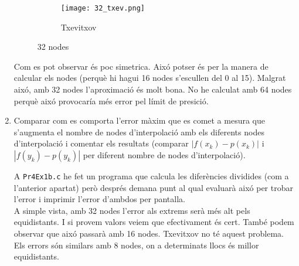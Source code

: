 \documentclass[a4paper, 12pt]{article}
\begin{document}
\begin{exercici}
\begin{enumerate}[label=\alph*)]
\begin{solucio}
\begin{figure}[H]
\begin{subfigure}{0.5\textwidth}
                        \centering
                        \texttt{[image: 32\_txev.png]}
                        \caption{Txevitxov}
                    \end{subfigure}
                    \caption{32 nodes}
                \end{figure}
                Com es pot observar és poc simetrica. Aixó potser és per la manera de calcular els
                nodes (perquè hi hagui 16 nodes s'escullen del 0 al 15). Malgrat aixó, amb 32 nodes
                l'aproximació és molt bona. No he calculat amb 64 nodes perquè aixó provocaría més
                error pel límit de presició.
            \end{solucio}
            \item Comparar com es comporta l'error màxim que es comet a mesura que s'augmenta el
            nombre de nodes d'interpolació amb els diferents nodes d'interpolació i comentar els
            resultats (comparar $\left\lvert f\left(x_k\right)-p\left(x_k\right)\right\rvert$ i $\left\lvert f\left(y_k\right)-p\left(y_k\right)\right\rvert$
            per diferent nombre de nodes d'interpolació). \\
            \begin{solucio}
                A \verb|Pr4Ex1b.c| he fet un programa que calcula les diferències dividides (com a
                l'anterior apartat) però després demana punt al qual evaluarà aixó per trobar
                l'error i imprimir l'error d'ambdos per pantalla.\\
                A simple vista, amb 32 nodes l'error als extrems serà més alt pels equidistants. I
                si provem valors veiem que efectivament és cert. També podem observar que aixó
                passarà amb 16 nodes. Txevitxov no té aquest problema. Els errors són similars amb 8
                nodes, on a determinats llocs és millor equidistants.
            \end{solucio}
        \end{enumerate}
    \end{exercici}
\end{document}
